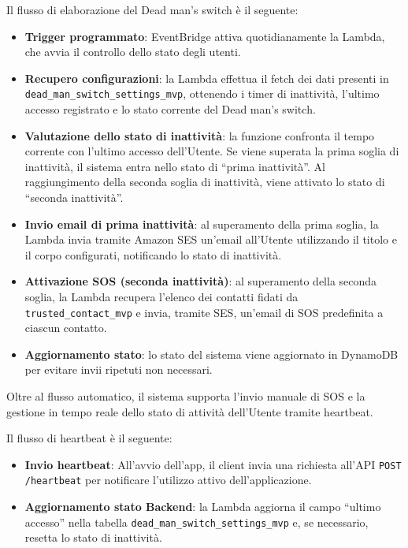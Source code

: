 \documentclass[a4paper,12pt]{article}
\begin{document}
Il flusso di elaborazione del Dead man's switch è il seguente:
\begin{itemize}
    \item \textbf{Trigger programmato}: EventBridge attiva quotidianamente la Lambda, che avvia il controllo dello stato degli utenti.
    
    \item \textbf{Recupero configurazioni}: la Lambda effettua il fetch dei dati presenti in \\ \texttt{dead\_man\_switch\_settings\_mvp}, ottenendo i timer di inattività, l’ultimo accesso registrato e lo stato corrente del Dead man's switch.
    
    \item \textbf{Valutazione dello stato di inattività}: la funzione confronta il tempo corrente con l’ultimo accesso dell’Utente. Se viene superata la prima soglia di inattività, il sistema entra nello stato di “prima inattività”. Al raggiungimento della seconda soglia di inattività, viene attivato lo stato di “seconda inattività”.
    
    \item \textbf{Invio email di prima inattività}: al superamento della prima soglia, la Lambda invia tramite Amazon SES un’email all’Utente utilizzando il titolo e il corpo configurati, notificando lo stato di inattività.
    
    \item \textbf{Attivazione SOS (seconda inattività)}: al superamento della seconda soglia, la Lambda recupera l’elenco dei contatti fidati da \texttt{trusted\_contact\_mvp} e invia, tramite SES, un’email di SOS predefinita a ciascun contatto.
    
    \item \textbf{Aggiornamento stato}: lo stato del sistema viene aggiornato in DynamoDB per evitare invii ripetuti non necessari.
\end{itemize}

Oltre al flusso automatico, il sistema supporta l’invio manuale di SOS e la gestione in tempo reale dello stato di attività dell’Utente tramite heartbeat.

Il flusso di heartbeat è il seguente:
\begin{itemize}
    \item \textbf{Invio heartbeat}: All'avvio dell'app, il client invia una richiesta all'API \texttt{POST /heartbeat} per notificare l’utilizzo attivo dell’applicazione.
    
    \item \textbf{Aggiornamento stato Backend}: la Lambda aggiorna il campo “ultimo accesso” nella tabella \texttt{dead\_man\_switch\_settings\_mvp} e, se necessario, resetta lo stato di inattività.
\end{itemize}
\end{document}

